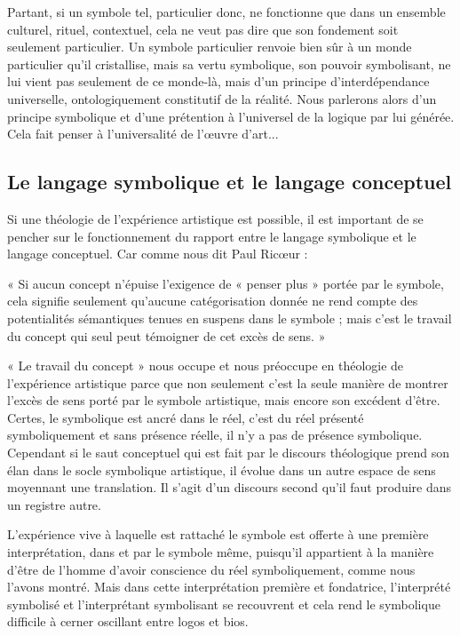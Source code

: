 Partant, si un symbole tel, particulier donc, ne fonctionne que dans un ensemble culturel, rituel, contextuel, cela ne veut pas dire que son fondement soit seulement particulier. Un symbole particulier renvoie bien sûr à un monde particulier qu’il cristallise, mais sa vertu symbolique, son pouvoir symbolisant, ne lui vient pas seulement de ce monde-là, mais d’un principe d’interdépendance universelle, ontologiquement constitutif de la réalité. Nous parlerons alors d’un principe symbolique et d’une prétention à l’universel de la logique par lui générée. Cela fait penser à l’universalité de l’œuvre d’art...

\subsection{Le langage symbolique et le langage conceptuel}

Si une théologie de l’expérience artistique est possible, il est important de se pencher sur le fonctionnement du rapport entre le langage symbolique et le langage conceptuel. Car comme nous dit Paul Ricœur :

\vspace{0.24cm}
{\footnotesize « Si aucun concept n’épuise l’exigence de « penser plus » portée par le symbole, cela signifie seulement qu’aucune catégorisation donnée ne rend compte des potentialités sémantiques tenues en suspens dans le symbole ; mais c’est le travail du concept qui seul peut témoigner de cet excès de sens. »}
\vspace{0.31cm}

« Le travail du concept » nous occupe et nous préoccupe en théologie de l’expérience artistique parce que non seulement c’est la seule manière de montrer l’excès de sens porté par le symbole artistique, mais encore son excédent d’être. Certes, le symbolique est ancré dans le réel, c’est du réel présenté symboliquement et sans présence réelle, il n’y a pas de présence symbolique. Cependant si le saut conceptuel qui est fait par le discours théologique prend son élan dans le socle symbolique artistique, il évolue dans un autre espace de sens moyennant une translation. Il s’agit d’un discours second qu’il faut produire dans un registre autre.

L’expérience vive à laquelle est rattaché le symbole est offerte à une première interprétation, dans et par le symbole même, puisqu’il appartient à la manière d’être de l’homme d’avoir conscience du réel symboliquement, comme nous l’avons montré. Mais dans cette interprétation première et fondatrice, l’interprété symbolisé et l’interprétant symbolisant se recouvrent et cela rend le symbolique difficile à cerner oscillant entre logos et bios.

